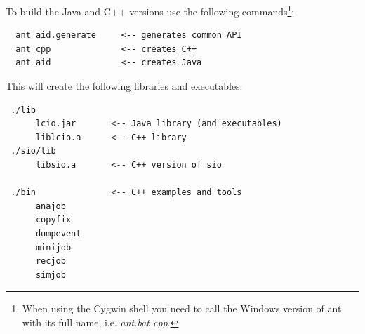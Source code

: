 \documentclass[twoside]{article}
\begin{document}





To build the Java and C++ versions use the following commands\footnote{When using the Cygwin shell you need to
call the Windows version of ant with its full name, i.e. {\em ant.bat cpp}.}:
\begin{verbatim}
  ant aid.generate     <-- generates common API
  ant cpp              <-- creates C++
  ant aid              <-- creates Java  
\end{verbatim}

This will create the following libraries and executables:

\begin{verbatim}
 ./lib
      lcio.jar       <-- Java library (and executables)
      liblcio.a      <-- C++ library
 ./sio/lib
      libsio.a       <-- C++ version of sio 

 ./bin               <-- C++ examples and tools
      anajob
      copyfix
      dumpevent
      minijob
      recjob
      simjob
\end{verbatim}
\end{document}
